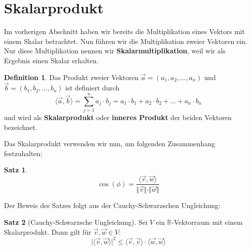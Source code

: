 \documentclass[11pt,a4paper]{scrartcl}
\theoremstyle{remark}
\theoremstyle{definition}
\newtheorem{definition}{Definition}[section]
\newtheorem{satz}{Satz}[section]
\begin{document}
\section{Skalarprodukt}
Im vorherigen Abschnitt haben wir bereits die Multiplikation eines Vektors mit einem Skalar betrachtet. Nun führen wir die Multiplikation zweier Vektoren ein. Nur diese Multiplikation nennen wir \textbf{Skalarmultiplikation}, weil wir als Ergebnis einen Skalar erhalten.
\begin{definition}
Das Produkt zweier Vektoren $\vec{a} = (a_1, a_2, ..., a_n)$ und $\vec{b} = (b_1, b_2, ..., b_n)$ ist definiert durch 
\[\langle \vec{a}, \vec{b} \rangle = \sum\limits_{j=1}^{n}a_j \cdot b_j = a_1 \cdot b_1 + a_2 \cdot b_2 + ... + a_n \cdot b_n\] und wird als \textbf{Skalarprodukt} oder \textbf{inneres Produkt} der beiden Vektoren bezeichnet.
\end{definition}
Das Skalarprodukt verwenden wir nun, um folgenden Zusammenhang festzuhalten:
\begin{satz}
\[\cos ({\phi}) = \frac{\langle \vec{v}, \vec{w}\rangle}{\Vert \vec{v} \Vert \cdot \Vert \vec{w} \Vert}\]
\end{satz} Der Beweis des Satzes folgt aus der Cauchy-Schwarzschen Ungleichung:
\begin{satz}[Cauchy-Schwarzsche Ungleichung]
Sei $V$ ein $\mathbb{R}$-Vektorraum mit einem Skalarprodukt. Dann gilt für $\vec{v}, \vec{w} \in V$:
\[\vert \langle \vec{v}, \vec{w} \rangle \vert ^{2} \leq \langle \vec{v}, \vec{v} \rangle \cdot \langle \vec{w}, \vec{w} \rangle\]
\end{satz}
\end{document}

